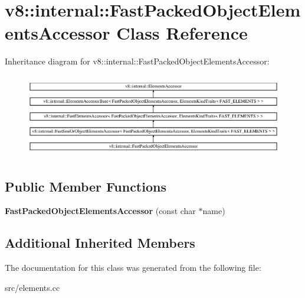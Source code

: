 \hypertarget{classv8_1_1internal_1_1_fast_packed_object_elements_accessor}{}\section{v8\+:\+:internal\+:\+:Fast\+Packed\+Object\+Elements\+Accessor Class Reference}
\label{classv8_1_1internal_1_1_fast_packed_object_elements_accessor}
Inheritance diagram for v8\+:\+:internal\+:\+:Fast\+Packed\+Object\+Elements\+Accessor\+:\begin{figure}[H]
\begin{center}
\leavevmode
\includegraphics[height=3.669725cm]{classv8_1_1internal_1_1_fast_packed_object_elements_accessor}
\end{center}
\end{figure}
\subsection*{Public Member Functions}
\begin{DoxyCompactItemize}
\item 
\hypertarget{classv8_1_1internal_1_1_fast_packed_object_elements_accessor_a650cc360bf524563b88beeefd2770040}{}{\bfseries Fast\+Packed\+Object\+Elements\+Accessor} (const char $\ast$name)\label{classv8_1_1internal_1_1_fast_packed_object_elements_accessor_a650cc360bf524563b88beeefd2770040}

\end{DoxyCompactItemize}
\subsection*{Additional Inherited Members}


The documentation for this class was generated from the following file\+:\begin{DoxyCompactItemize}
\item 
src/elements.\+cc\end{DoxyCompactItemize}
